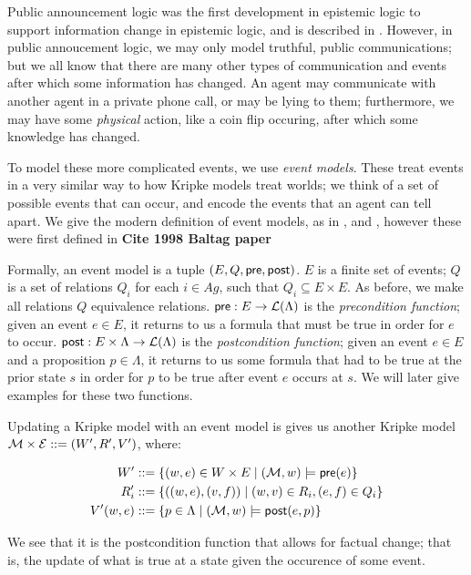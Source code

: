 \documentclass[12pt, a4paper]{article}
\begin{document}
Public announcement logic was the first development in epistemic logic to
support information change in epistemic logic, and is described in \cite{PAL}.
However, in public annoucement logic, we may only model truthful, public
communications; but we all know that there are many other types of communication
and events after which some information has changed. An agent may communicate
with another agent in a private phone call, or may be lying to them;
furthermore, we may have some \textit{physical} action, like a coin flip
occuring, after which some knowledge has changed.

To model these more complicated events, we use \textit{event models}. These
treat events in a very similar way to how Kripke models treat worlds; we think
of a set of possible events that can occur, and encode the events that an agent
can tell apart. We give the modern definition of event models, as in
\cite{MalvinThesis}, and \cite{AutomataTechniques}, however these were first
defined in \textbf{Cite 1998 Baltag paper}

Formally, an event model  is a tuple $(E, Q, \textsf{pre}, \textsf{post})$. $E$ is a finite set
of events; $Q$ is a set of relations $Q_i$ for each $i \in Ag$, such that $Q_i
\subseteq E \times E$. As before, we make all relations $Q$ equivalence
relations. $\textsf{pre} : E \rightarrow \mathcal{L}(\Lambda) $ is the \textit{precondition
  function}; given an event $e \in E$, it returns to us a formula that must be
true in order for $e$ to occur. $\textsf{post} : E \times \Lambda \rightarrow
\mathcal{L}(\Lambda)$ is the \textit{postcondition function}; given an event $e \in
E$ and a proposition $p \in \Lambda$, it returns to us some formula that had to
be true at the prior state $s$ in order for $p$ to be true after event $e$
occurs at $s$. We will later give examples for these two functions.

Updating a Kripke model  with an event model  is gives us another
Kripke model $\mathcal{M} \times \mathcal{E} ::= (W', R', V')$, where:

\begin{align*}
  W'   &::= \left\{(w, e) \in W \times E \mid (\mathcal{M}, w) \models \textsf{pre}(e)\right\} \\
  R_i' &::= \left\{((w, e), (v, f)) \mid (w, v) \in R_i, (e, f) \in Q_i \right\} \\
  V'(w, e) &::= \left\{ p \in \Lambda \mid (\mathcal{M}, w) \models \textsf{post}(e, p) \right\}
\end{align*}

We see that it is the postcondition function that allows for factual change;
that is, the update of what is true at a state given the occurence of some
event.
\end{document}
